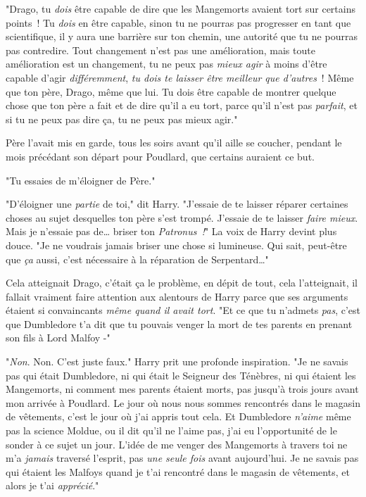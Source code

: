 "Drago, tu \emph{dois} être capable de dire que les Mangemorts avaient tort sur certains points~! Tu \emph{dois} en être capable, sinon tu ne pourras pas progresser en tant que scientifique, il y aura une barrière sur ton chemin, une autorité que tu ne pourras pas contredire. Tout changement n'est pas une amélioration, mais toute amélioration est un changement, tu ne peux pas \emph{mieux agir} à moins d'être capable d'agir \emph{différemment}, \emph{tu dois te laisser être meilleur que d'autres}~! Même que ton père, Drago, même que lui. Tu dois être capable de montrer quelque chose que ton père a fait et de dire qu'il a eu tort, parce qu'il n'est pas \emph{parfait}, et si tu ne peux pas dire ça, tu ne peux pas mieux agir."

Père l'avait mis en garde, tous les soirs avant qu'il aille se coucher, pendant le mois précédant son départ pour Poudlard, que certains auraient ce but.

"Tu essaies de m'éloigner de Père."

"D'éloigner une \emph{partie} de toi," dit Harry. "J'essaie de te laisser réparer certaines choses au sujet desquelles ton père s'est trompé. J'essaie de te laisser \emph{faire mieux}. Mais je n'essaie pas de… briser ton \emph{Patronus~!}" La voix de Harry devint plus douce. "Je ne voudrais jamais briser une chose si lumineuse. Qui sait, peut-être que \emph{ça} aussi, c'est nécessaire à la réparation de Serpentard…"

Cela atteignait Drago, c'était ça le problème, en dépit de tout, cela l'atteignait, il fallait vraiment faire attention aux alentours de Harry parce que ses arguments étaient si convaincants \emph{même quand il avait tort}. "Et ce que tu n'admets \emph{pas}, c'est que Dumbledore t'a dit que tu pouvais venger la mort de tes parents en prenant son fils à Lord Malfoy -"

"\emph{Non}. Non. C'est juste faux." Harry prit une profonde inspiration. "Je ne savais pas qui était Dumbledore, ni qui était le Seigneur des Ténèbres, ni qui étaient les Mangemorts, ni comment mes parents étaient morts, pas jusqu'à trois jours avant mon arrivée à Poudlard. Le jour où nous nous sommes rencontrés dans le magasin de vêtements, c'est le jour où j'ai appris tout cela. Et Dumbledore \emph{n'aime} même pas la science Moldue, ou il dit qu'il ne l'aime pas, j'ai eu l'opportunité de le sonder à ce sujet un jour. L'idée de me venger des Mangemorts à travers toi ne m'a \emph{jamais} traversé l'esprit, pas \emph{une seule fois} avant aujourd'hui. Je ne savais pas qui étaient les Malfoys quand je t'ai rencontré dans le magasin de vêtements, et alors je t'ai \emph{apprécié}."

